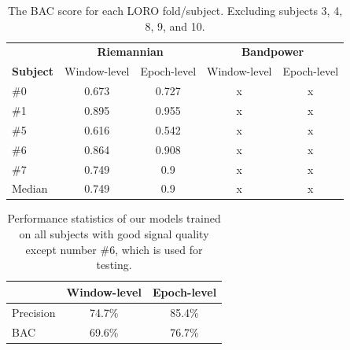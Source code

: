         \begin{table}[h]
            \centering
            \begin{tabular}{lcccc}
                \toprule
                & \multicolumn{2}{c}{\textbf{Riemannian}} & \multicolumn{2}{c}{\textbf{Bandpower}} \\
                \cmidrule(lr){2-3}
                \cmidrule(lr){4-5}
                \textbf{Subject} & Window-level & Epoch-level & Window-level & Epoch-level \\
                \midrule
                \#0 & 0.673 & 0.727 & x & x \\
                \#1 & 0.895 & 0.955 & x & x \\
                \#5 & 0.616 & 0.542 & x & x \\
                \#6 & 0.864 & 0.908 & x & x \\
                \#7 & 0.749 & 0.9   & x & x \\
                \midrule
                Median & 0.749 & 0.9 & x & x \\
                \bottomrule
            \end{tabular}
            \caption{The BAC score for each LORO fold/subject. Excluding subjects 3, 4, 8, 9, and 10.}\label{table:bac-selective}
        \end{table}

        \begin{table}
            \begin{center}
                \begin{tabular}{lcc}
                    \toprule
                            & Window-level & Epoch-level \\
                    \midrule
                    Precision & 74.7\% & 85.4\%  \\
                    BAC       & 69.6\% & 76.7\%  \\
                    \bottomrule
                \end{tabular}
                \caption{Performance statistics of our models trained on all subjects with good signal quality except number \#6, which is used for testing.}\label{fig:stats}
            \end{center}
        \end{table}


